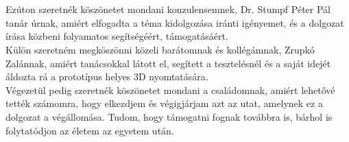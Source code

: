 \chapter*{\koszonetnyilvanitas}

Ezúton szeretnék köszönetet mondani konzulensemnek, Dr. Stumpf Péter Pál tanár úrnak, amiért elfogadta a téma kidolgozása iránti igényemet, és a dolgozat írása közbeni folyamatos segítségéért, támogatásáért. \\

Külön szeretném megköszönni közeli barátomnak és kollégámnak, Zrupkó Zalánnak, amiért tanácsokkal látott el, segített a tesztelésnél és a saját idejét áldozta rá a prototípus helyes 3D nyomtatására.\\

Végezetül pedig szeretnék köszönetet mondani a családomnak, amiért lehetővé tették számomra, hogy elkezdjem és végigjárjam azt az utat, amelynek ez a dolgozat a végállomása. Tudom, hogy támogatni fognak továbbra is, bárhol is folytatódjon az életem az egyetem után.